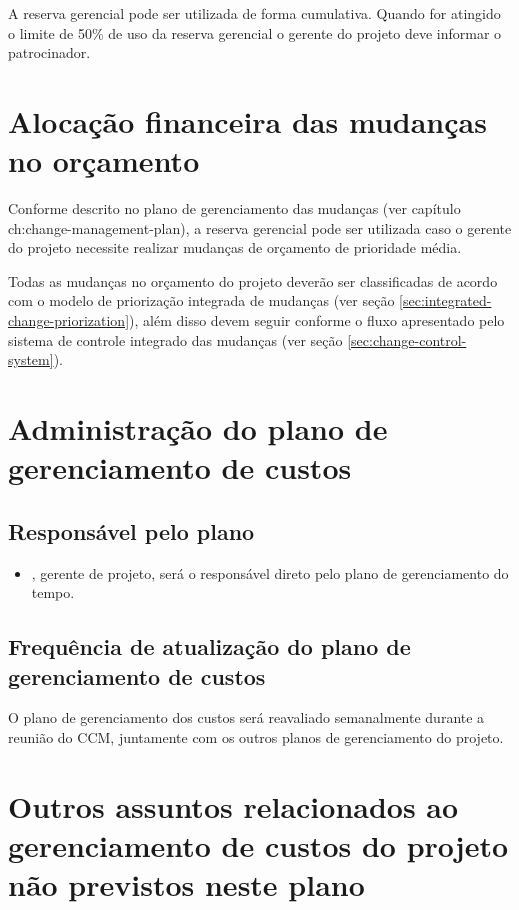 A reserva gerencial pode ser utilizada de forma cumulativa. Quando for atingido o limite de 50\% de uso da reserva gerencial o gerente do projeto deve informar o patrocinador.

\section{Alocação financeira das mudanças no orçamento}

Conforme descrito no plano de gerenciamento das mudanças (ver capítulo ch:change-management-plan), a reserva gerencial pode ser utilizada caso o gerente do projeto necessite realizar mudanças de orçamento de prioridade média.

Todas as mudanças no orçamento do projeto deverão ser classificadas de acordo com o modelo de priorização integrada de mudanças (ver seção \ref{sec:integrated-change-priorization}), além disso devem seguir conforme o fluxo apresentado pelo sistema de controle integrado das mudanças (ver seção \ref{sec:change-control-system}).

\section{Administração do plano de gerenciamento de custos}

\subsection{Responsável pelo plano}

\begin{itemize}
	\item \projectManagerName{}, gerente de projeto, será o responsável direto pelo plano de gerenciamento do tempo.
\end{itemize}

\subsection{Frequência de atualização do plano de gerenciamento de custos}

O plano de gerenciamento dos custos será reavaliado semanalmente durante a reunião do CCM, juntamente com os outros planos de gerenciamento do projeto.

\section{Outros assuntos relacionados ao gerenciamento de custos do projeto não previstos neste plano}

